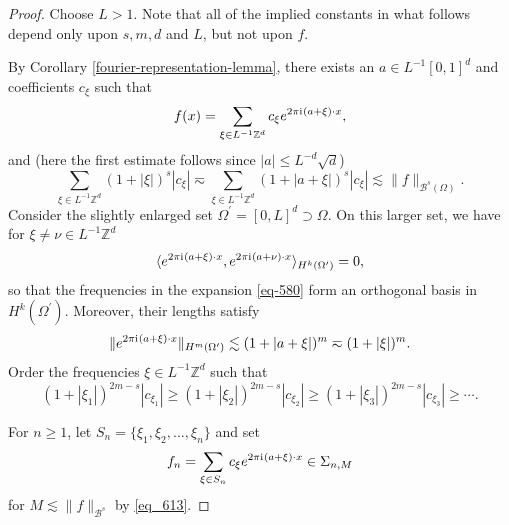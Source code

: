 \begin{proof}
 Choose $L > 1$. Note that all of the implied constants in what follows depend only upon $s,m,d$ and $L$, but not upon $f$. 
 
 By Corollary \ref{fourier-representation-lemma}, there exists an $a\in L^{-1}[0,1]^d$ and coefficients $c_\xi$ such that
  \begin{equation}\label{eq-580}
  f(x) = \sum_{\xi\in L^{-1}\mathbb{Z}^d}c_\xi e^{2\pi {\mathrm{i}\mkern1mu}  (a+\xi)\cdot x},
 \end{equation}
 and (here the first estimate follows since $|a|\leq L^{-d}\sqrt{d}$)
 \begin{equation}\label{eq_613}
  \sum_{\xi\in L^{-1}\mathbb{Z}^d} (1+|\xi|)^s|c_\xi| \eqsim \sum_{\xi\in L^{-1}\mathbb{Z}^d} (1+|a+\xi|)^s|c_\xi|  \lesssim \|f\|_{\mathcal{B}^s(\Omega)}.
 \end{equation}
 Consider the slightly enlarged set $\Omega^\prime = [0,L]^d \supset \Omega$. On this larger set, we have for $\xi\neq\nu\in L^{-1}\mathbb{Z}^d$
 \begin{equation}\label{orthogonality-condition}
  \langle e^{2\pi {\mathrm{i}\mkern1mu}  (a+\xi)\cdot x}, e^{2\pi {\mathrm{i}\mkern1mu}  (a+\nu)\cdot x}\rangle_{H^k(\Omega^\prime)} = 0,
 \end{equation}
 so that the frequencies in the expansion \eqref{eq-580} form an orthogonal basis in $H^k(\Omega^\prime)$. Moreover, their lengths satisfy
 \begin{equation}\label{length-estimate}
  \|e^{2\pi {\mathrm{i}\mkern1mu}  (a+\xi)\cdot x}\|_{H^m(\Omega^\prime)} \lesssim (1+|a+\xi|)^m \eqsim (1+|\xi|)^m.
 \end{equation}
 Order the frequencies $\xi\in L^{-1}\mathbb{Z}^d$ such that
 \begin{equation}
   (1+|\xi_1|)^{2m-s}|c_{\xi_1}| \geq (1+|\xi_2|)^{2m-s}|c_{\xi_2}| \geq (1+|\xi_3|)^{2m-s}|c_{\xi_3}| \geq \cdots.
 \end{equation}

 For $n \geq 1$, let $S_n = \{\xi_1,\xi_2,...,\xi_n\}$ and set 
 \begin{equation}
  f_n = \sum_{\xi\in S_n}c_\xi e^{2\pi {\mathrm{i}\mkern1mu}  (a+\xi)\cdot x} \in \Sigma_{n,M}
 \end{equation}
 for $M\lesssim \|f\|_{\mathcal{B}^s}$ by \eqref{eq_613}.
 

\end{proof}
